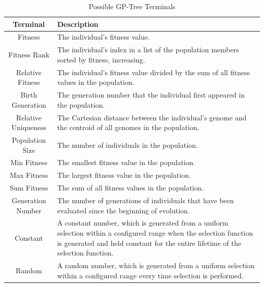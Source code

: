 \documentclass[sigconf]{acmart}
\begin{document}
\begin{table}
	\centering
	\caption{Possible GP-Tree Terminals}
	\label{tab:gp-terminals}
	\begin{tabular}{c|p{4.5cm}}
		\toprule
		Terminal & Description\\
		\midrule
		Fitness &  The individual's fitness value. \\
		\hline
		Fitness Rank &  The individual's index in a list of the population members sorted by fitness, increasing. \\    
		\hline
		Relative Fitness &  The individual's fitness value divided by the sum of all fitness values in the population. \\
		\hline
		Birth Generation &  The generation number that the individual first appeared in the population. \\    
		\hline
		Relative Uniqueness &  The Cartesian distance between the individual's genome and the centroid of all genomes in the population. \\
		\hline
		Population Size &  The number of individuals in the population. \\
		\hline
		Min Fitness &  The smallest fitness value in the population. \\
		\hline
		Max Fitness &  The largest fitness value in the population. \\ 
		\hline
		Sum Fitness &  The sum of all fitness values in the population. \\
		\hline
		Generation Number &  The number of generations of individuals that have been evaluated since the beginning of evolution. \\
		\hline
		Constant &  A constant number, which is generated from a uniform selection within a configured range when the selection function is generated and held constant for the entire lifetime of the selection function. \\
		\hline
		Random &  A random number, which is generated from a uniform selection within a configured range every time selection is performed. \\                
		
		
		\bottomrule
	\end{tabular}
\end{table}
\end{document}
